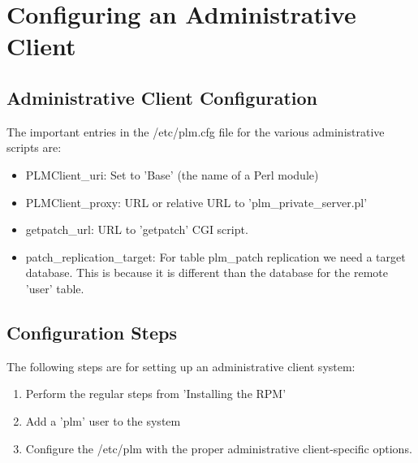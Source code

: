 \section {Configuring an Administrative Client}

\subsection{Administrative Client Configuration}
The important entries in the /etc/plm.cfg file for the various administrative scripts are:

\begin{itemize}
\item PLMClient\_uri: Set to 'Base' (the name of a Perl module)
\item PLMClient\_proxy: URL or relative URL to 'plm\_private\_server.pl'
\item getpatch\_url: URL to 'getpatch' CGI script.
\item patch\_replication\_target: For table plm\_patch replication we need a target database.  This is because it is different than the database for the remote 'user' table.
\end{itemize}

\subsection{Configuration Steps}
The following steps are for setting up an administrative client system:
\begin{enumerate}
\item Perform the regular steps from 'Installing the RPM'
\item Add a 'plm' user to the system
\item Configure the /etc/plm with the proper administrative client-specific options.
\end{enumerate}
